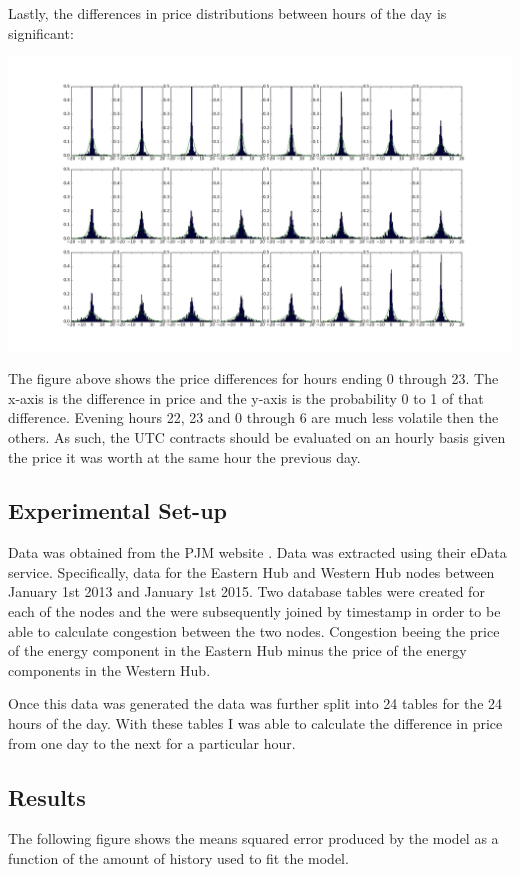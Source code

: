 \documentclass{report}
\begin{document}
Lastly, the differences in price distributions between hours of the day is significant:
\begin{center}
\includegraphics[width=500pt, keepaspectratio=true]{hourly_distributions.jpg}
\end{center}
The figure above shows the price differences for hours ending 0 through 23. The x-axis
is the difference in price and the y-axis is the probability 0 to 1 of that difference.
Evening hours 22, 23 and 0 through 6 are much less volatile then the others. As such,
the UTC contracts should be evaluated on an hourly basis given the price it was
worth at the same hour the previous day.

\subsection*{Experimental Set-up}
Data was obtained from the PJM website \cite{pjm}. Data was extracted using their
eData service. Specifically, data for the Eastern Hub and Western Hub nodes between
January 1st 2013 and January 1st 2015. Two database tables were created for each
of the nodes and the were subsequently joined by timestamp in order to be able to
calculate congestion between the two nodes. Congestion beeing the price of the
energy component in the Eastern Hub minus the price of the energy components in the
Western Hub.

Once this data was generated the data was further split into 24 tables for the 24 hours
of the day. With these tables I was able to calculate the difference in price from
one day to the next for a particular hour.



\subsection*{Results}
The following figure shows the means squared error produced by the model as a
function of the amount of history used to fit the model.
\end{document}
